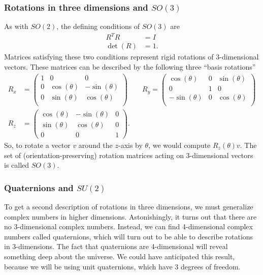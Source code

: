 \documentclass[11pt]{article}
\numberwithin{equation}{section}
\begin{document}
\subsubsection{Rotations in three dimensions and $SO(3)$}
As with $SO(2)$, the defining conditions of $SO(3)$ are
\begin{align}
R^TR &= I \label{eq:def-so3-norm-preserving} \\
\det(R) &= 1. \label{eq:def-so3-parity-preserving}
\end{align}
Matrices satisfying these two conditions represent rigid rotations of 3-dimensional vectors. These matrices can be described by the following three ``basis rotations''
\begin{align}
R_x &= \begin{pmatrix}
1 & 0 & 0 \\
0 & \cos(\theta) & -\sin(\theta) \\
0 & \sin(\theta) & \cos(\theta) \\
\end{pmatrix} \qquad 
R_y = \begin{pmatrix}
\cos(\theta) & 0 & \sin(\theta) \\
0 & 1 & 0 \\
-\sin(\theta) & 0 & \cos(\theta) \\
\end{pmatrix} \nonumber \\
R_z &= \begin{pmatrix}
\cos(\theta) & -\sin(\theta) & 0 \\
\sin(\theta) & \cos(\theta) & 0 \\
0 & 0 & 1
\end{pmatrix}. \label{eq:rotation-matrices-3d}
\end{align}
So, to rotate a vector $v$ around the $z$-axis by $\theta$, we would compute $R_z(\theta) v$. The set of (orientation-preserving) rotation matrices acting on 3-dimensional vectors is called $SO(3)$.

\subsubsection{Quaternions and $SU(2)$}
To get a second description of rotations in three dimensions, we must generalize complex numbers in higher dimensions. Astonishingly, it turns out that there are no 3-dimensional complex numbers. Instead, we can find 4-dimensional complex numbers called quaternions, which will turn out to be able to describe rotations in 3-dimensions. The fact that quaternions are 4-dimensional will reveal something deep about the universe. We could have anticipated this result, because we will be using unit quaternions, which have 3 degrees of freedom.
\end{document}
